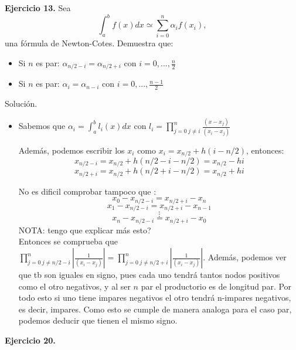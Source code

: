 \documentclass[11pt]{article}
\begin{document}
\textbf{Ejercicio 13.} Sea $$ \int_a^b f(x) dx \simeq \sum_{i=0}^n \alpha_i f(x_i),  $$
una fórmula de Newton-Cotes. Demuestra que:

\begin{itemize}
\item Si $n$ es par: $ \alpha_{n/2-i}=\alpha_{n/2+i}$ con $ i = 0,...,\frac{n}{2}$
\item Si $n$ es par: $ \alpha_{i}=\alpha_{n-i}$ con $ i = 0,...,\frac{n-1}{2}$
\end{itemize}

{Solución.\\}

\begin{itemize}
\item Sabemos que $\alpha_{i}=\int_a^b l_i(x) dx $ con $l_i = \prod_{j = 0  \ j\neq i}^n \frac{(x-x_j)}{(x_i-x_j)}$

Además, podemos escribir los $x_i$ como $x_i= x_{n/2} + h(i-n/2)$, entonces:   $$x_{n/2-i}  = x_{n/2} + h(n/2-i-n/2)   = x_{n/2} - hi $$ 
$$x_{n/2+i} = x_{n/2} + h(n/2+i-n/2) = x_ {n/2} + hi $$



No es dificil comprobar tampoco que :
$$  x_0 - x_{n/2-i} = x_{n/2+i}-x_n$$
$$ x_1 - x_{n/2-i} = x_{n/2+i}-x_{n-1}$$
$$\vdots$$
$$  x_n - x_{n/2-i} = x_{n/2+i}-x_0$$
NOTA: tengo que explicar más  esto?\\

Entonces se comprueba que $\prod_{j = 0  \ j\neq n/2-i}^n |\frac{1}{(x_i-x_j)}|=\prod_{j = 0  \ j\neq n/2+i}^n |\frac{1}{(x_i-x_j)}|$. Además, podemos ver que tb son iguales en signo, pues cada uno tendrá tantos nodos positivos como el otro negativos, y al ser $n$ par el productorio es de longitud par. Por todo esto si uno tiene impares negativos el otro tendrá  n-impares negativos, es decir, impares. Como esto se cumple de manera analoga para el caso par, podemos deducir que tienen el mismo signo.


\end{itemize}

\textbf{Ejercicio 20.}
\end{document}
